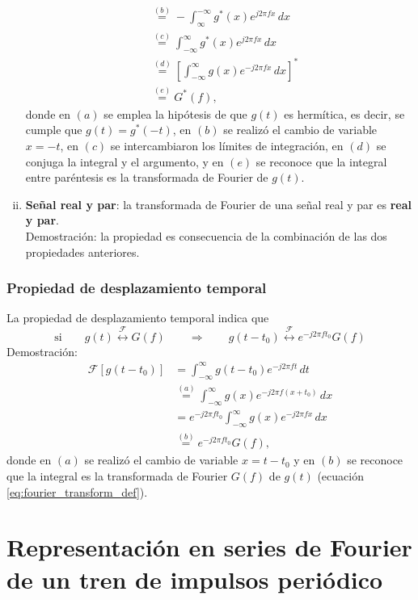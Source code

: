 \documentclass[a4paper]{article}
\begin{document}
\begin{enumerate}[(i)]
\begin{align*}
    &\overset{(b)}{=}-\int_{\infty}^{-\infty}g^*(x)e^{j2\pi fx}\,dx\\
    &\overset{(c)}{=}\int_{-\infty}^{\infty}g^*(x)e^{j2\pi fx}\,dx\\
    &\overset{(d)}{=}\left[\int_{-\infty}^{\infty}g(x)e^{-j2\pi fx}\,dx\right]^*\\
    &\overset{(e)}{=}G^*(f),
 \end{align*}
 donde en \((a)\) se emplea la hipótesis de que \(g(t)\) es hermítica, es decir, se cumple que \(g(t)=g^*(-t)\), en \((b)\) se realizó el cambio de variable \(x=-t\), en \((c)\) se intercambiaron los límites de integración, en \((d)\) se conjuga la integral y el argumento, y en \((e)\) se reconoce que la integral entre paréntesis es la transformada de Fourier de \(g(t)\).
\item \textbf{Señal real y par}: la transformada de Fourier de una señal real y par es \textbf{real y par}.\\
Demostración: la propiedad es consecuencia de la combinación de las dos propiedades anteriores.
\end{enumerate}


\subsubsection{Propiedad de desplazamiento temporal}\label{ap:fourier_transform_property_time_shift}

La propiedad de desplazamiento temporal indica que
\[
 \textrm{si}\qquad g(t)\overset{\mathcal{F}}{\longleftrightarrow}G(f)\qquad\Rightarrow\qquad g(t-t_0)\overset{\mathcal{F}}{\longleftrightarrow}e^{-j2\pi ft_0}G(f)
\]
Demostración:
\begin{align*}
 \mathcal{F}\left[g(t-t_0)\right] &=\int_{-\infty}^{\infty}g(t-t_0)e^{-j2\pi ft}\,dt\\
   &\overset{(a)}{=}\int_{-\infty}^{\infty}g(x)e^{-j2\pi f(x+t_0)}\,dx\\
   &=e^{-j2\pi ft_0}\int_{-\infty}^{\infty}g(x)e^{-j2\pi fx}\,dx\\
   &\overset{(b)}{=}e^{-j2\pi ft_0}G(f),
\end{align*}
donde en \((a)\) se realizó el cambio de variable \(x=t-t_0\) y en \((b)\) se reconoce que la integral es la transformada de Fourier \(G(f)\) de \(g(t)\) (ecuación \ref{eq:fourier_transform_def}).

\section{Representación en series de Fourier de un tren de impulsos periódico}\label{ap:impulse_train_fourier_series}
 
\end{document}
